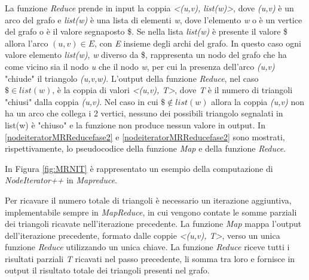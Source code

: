 \documentclass[LaM,binding=0.6cm]{sapthesis}
\begin{document}
La funzione \textit{Reduce} prende in input la coppia \textit{<(u,v), list(w)>}, dove \textit{(u,v)} è un arco del grafo e \textit{list(w)} è una lista di elementi \textit{w}, dove  l'elemento \textit{w} o è un vertice del grafo o è il valore segnaposto \$.
Se nella lista \textit{list(w)} è presente il valore \$ allora l'arco \textit{$(u,v) \in E$}, con \textit{E} insieme degli archi del grafo. In questo caso ogni valore elemento \textit{list(w)}, \textit{w} diverso da \$, rappresenta un nodo del grafo che ha come vicino sia il nodo \textit{u} che il nodo \textit{w}, per cui la presenza dell'arco \textit{(u,v)} "chiude" il triangolo \textit{(u,v,w)}. 
L'output della funzione \textit{Reduce}, nel caso \textit{$\$\in list(w)$}, è la coppia di valori \textit{<(u,v), T>}, dove \textit{T} è il numero di triangoli "chiusi" dalla coppia \textit{(u,v)}. Nel caso in cui \textit{$\$\notin list(w)$} allora la coppia \textit{(u,v)} non ha un arco che collega i 2 vertici, nessuno dei possibili triangolo segnalati in list(w) è "chiuso" e la funzione non produce nessun valore in output.
In \ref{nodeiteratorMRReducefase2} e  \ref{nodeiteratorMRReducefase2} sono mostrati, rispettivamente, lo pseudocodice della funzione \textit{Map} e della funzione \textit{Reduce}.

In Figura \ref{fig:MRNIT} è rappresentato un esempio della computazione di \textit{NodeIterator++} in \textit{Mapreduce}.

Per ricavare il numero totale di triangoli è necessario un iterazione aggiuntiva, implementabile sempre in \textit{MapReduce}, in cui vengono contate le somme parziali dei triangoli ricavate  nell'iterazione precedente. La funzione \textit{Map} mappa l'output dell'iterazione precedente, formato dalle coppie \textit{<(u,v), T>}, verso un unica funzione \textit{Reduce} utilizzando un unica chiave. La funzione \textit{Reduce} riceve tutti i risultati parziali \textit{T} ricavati nel passo precedente, li somma tra loro e fornisce in output il risultato totale dei triangoli presenti nel grafo.


\begin{minipage}{\linewidth}
	
\end{minipage}
\begin{minipage}{\linewidth}
	
\end{minipage}
\end{document}
